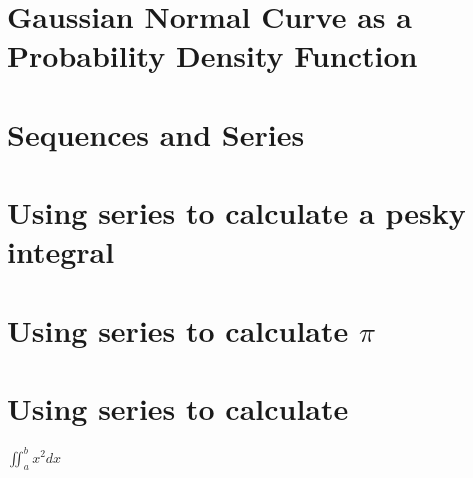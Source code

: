\documentclass{article}
\begin{document}
\section{Gaussian Normal Curve as a Probability Density Function}

\section{Sequences and Series}

\section{Using series to calculate a pesky integral}

\section{Using series to calculate $\pi$}

\section{Using series to calculate}

$\iint_{a}^{b} x^2 dx$
\end{document}
